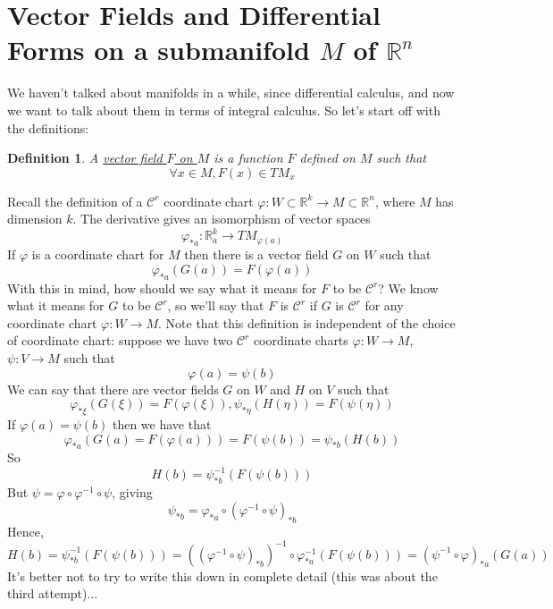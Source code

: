 \documentclass{article}
\newtheorem{definition}{Definition}
\newcommand{\reals}[0]{\mathbb{R}}
\newcommand{\mc}[1]{\mathcal{#1}}
\begin{document}
\section{Vector Fields and Differential Forms on a submanifold \(M\) of \(\reals^n\)}

We haven't talked about manifolds in a while, since differential calculus, and now we want to talk about them in terms of integral calculus. So let's start off with the definitions:
\begin{definition}
  A \underline{vector field \(F\) on \(M\)} is a function \(F\) defined on \(M\) such that
  \begin{equation}
    \forall x \in M, F(x) \in TM_x
  \end{equation}
\end{definition}
Recall the definition of a \(\mc{C}^r\) coordinate chart \(\varphi: W \subset \reals^k \to M \subset \reals^n\), where \(M\) has dimension \(k\). The derivative gives an isomorphism of vector spaces
\begin{equation}
  \varphi_{*a} : \reals_a^k \to TM_{\varphi(a)}
\end{equation}
If \(\varphi\) is a coordinate chart for \(M\) then there is a vector field \(G\) on \(W\) such that
\begin{equation}
  \varphi_{*a}(G(a)) = F(\varphi(a))
\end{equation}
With this in mind, how should we say what it means for \(F\) to be \(\mc{C}^r\)? We know what it means for \(G\) to be \(\mc{C}^r\), so we'll say that \(F\) is \(\mc{C}^r\) if \(G\) is \(\mc{C}^r\) for any coordinate chart \(\varphi: W \to M\). Note that this definition is independent of the choice of coordinate chart: suppose we have two \(\mc{C}^r\) coordinate charts \(\varphi: W \to M\), \(\psi : V \to M\) such that
\begin{equation}
  \varphi(a) = \psi(b)
\end{equation}
We can say that there are vector fields \(G\) on \(W\) and \(H\) on \(V\) such that
\begin{equation}
  \varphi_{*\xi}(G(\xi)) = F(\varphi(\xi)), \psi_{*\eta}(H(\eta)) = F(\psi(\eta))
\end{equation}
If \(\varphi(a) = \psi(b)\) then we have that
\begin{equation}
  \varphi_{*a}(G(a) = F(\varphi(a))) = F(\psi(b)) = \psi_{*b}(H(b))
\end{equation}
So
\begin{equation}
  H(b) = \psi_{*b}^{-1}(F(\psi(b)))
\end{equation}
But \(\psi = \varphi \circ \varphi^{-1} \circ \psi\), giving
\begin{equation}
  \psi_{*b} = \varphi_{*a} \circ (\varphi^{-1} \circ \psi)_{*b}
\end{equation}
Hence,
\begin{equation}
  H(b) = \psi_{*b}^{-1}(F(\psi(b))) = ((\varphi^{-1} \circ \psi)_{*b})^{-1} \circ \varphi^{-1}_{*a}(F(\psi(b))) = (\psi^{-1} \circ \varphi)_{*a}(G(a))
\end{equation}
It's better not to try to write this down in complete detail (this was about the third attempt)... 
\end{document}
